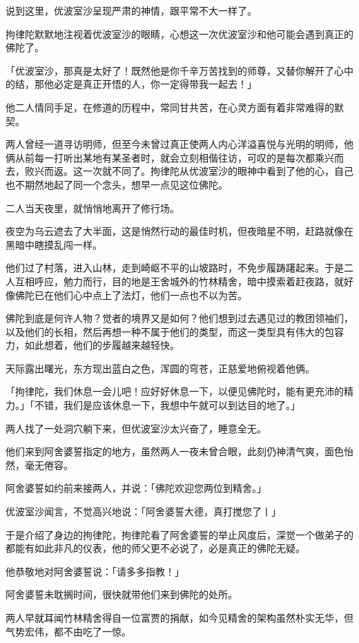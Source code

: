 \documentclass[twoside,openany]{book}
\begin{document}
说到这里，优波室沙呈现严肃的神情，跟平常不大一样了。

拘律陀默默地注视着优波室沙的眼睛，心想这一次优波室沙和他可能会遇到真正的佛陀了。

「优波室沙，那真是太好了！既然他是你千辛万苦找到的师尊，又替你解开了心中的结，那他必定是真正开悟的人，你一定得带我一起去！」

他二人情同手足，在修道的历程中，常同甘共苦，在心灵方面有着非常难得的默契。

两人曾经一道寻访明师，但至今未曾过真正使两人内心洋溢喜悦与光明的明师，他俩从前每一打听出某地有某圣者时，就会立刻相偕往访，可叹的是每次都乘兴而去，败兴而返。这一次就不同了。拘律陀从优波室沙的眼神中看到了他的心，自己也不期然地起了同一个念头，想早一点见这位佛陀。

二人当天夜里，就悄悄地离开了修行场。

夜空为乌云遮去了大半面，这是悄然行动的最佳时机，但夜暗星不明，赶路就像在黑暗中瞎摸乱闯一样。

他们过了村落，进入山林，走到崎岖不平的山坡路时，不免步履踌躇起来。于是二人互相呼应，勉力而行，目的地是王舍城外的竹林精舍，暗中摸索着赶夜路，就好像佛陀已在他们心中点上了法灯，他们一点也不以为苦。

佛陀到底是何许人物？觉者的境界又是如何？他们想到过去遇见过的教团领袖们，以及他们的长相，然后再想一种不属于他们的类型，而这一类型具有伟大的包容力，如此想着，他们的步履越来越轻快。

天际露出曙光，东方现出蓝白之色，浑圆的穹苍，正慈爱地俯视着他俩。

「拘律陀，我们休息一会儿吧！应好好休息一下，以便见佛陀时，能有更充沛的精力。」「不错，我们是应该休息一下，我想中午就可以到达目的地了。」

两人找了一处洞穴躺下来，但优波室沙太兴奋了，睡意全无。

他们来到阿舍婆誓指定的地方，虽然两人一夜未曾合眼，此刻仍神清气爽，面色怡然，毫无倦容。

阿舍婆誓如约前来接两人，并说：「佛陀欢迎您两位到精舍。」

优波室沙闻言，不觉高兴地说：「阿舍婆誓大德，真打搅您了丨」

于是介绍了身边的拘律陀，拘律陀看了阿舍婆誓的举止风度后，深觉一个做弟子的都能有如此非凡的仪表，他的师父更不必说了，必是真正的佛陀无疑。

他恭敬地对阿舍婆誓说：「请多多指教！」

阿舍婆誓未耽搁时间，很快就带他们来到佛陀的处所。

两人早就耳闻竹林精舍得自一位富贾的捐献，如今见精舍的架构虽然朴实无华，但气势宏伟，都不由吃了一惊。
\end{document}
